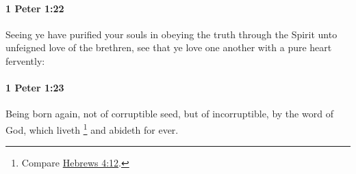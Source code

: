 		\paragraph{1 Peter 1:22} %
			\label{1PETER-1-22}

			Seeing ye have purified your souls in obeying the truth through the Spirit unto unfeigned love of the brethren, see that ye love one another with a pure heart fervently:

			\begin{framed}
			\scriptsize
				\begin{compactdesc}
					\item[SBLG] 
				\end{compactdesc}
			\end{framed}

		\paragraph{1 Peter 1:23} %
			\label{1PETER-1-23}

			Being born again, not of corruptible seed, but of incorruptible, by the word of God, which liveth%
				\footnote{%
					Compare \hyperref[HEBREWS-4-12]{Hebrews 4:12}.
					}
			and abideth for ever.

